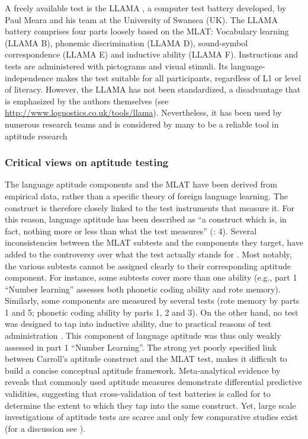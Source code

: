 \documentclass[output=paper]{langscibook}
\begin{document}
A freely available test is the LLAMA \citep{MearaEtAl2001}, a computer test battery developed, by Paul Meara and his team at the University of Swansea (UK). The LLAMA battery comprises four parts loosely based on the MLAT: Vocabulary learning (LLAMA B), phonemic discrimination (LLAMA D), sound-symbol correspondence (LLAMA E) and inductive ability (LLAMA F). Instructions and tests are administered with pictograms and visual stimuli. Its language-independence makes the test suitable for all participants, regardless of L1 or level of literacy. However, the LLAMA has not been standardized, a disadvantage that is emphasized by the authors themselves (see \url{http://www.lognostics.co.uk/tools/llama}{).} Nevertheless, it has been used by numerous research teams and is considered by many to be a reliable tool in aptitude research \citep{RogersEtAl2017}

\subsubsection{Critical views on aptitude testing} %

The language aptitude components and the MLAT have been derived from empirical data, rather than a specific theory of foreign language learning. The construct is therefore closely linked to the test instruments that measure it. For this reason, language aptitude has been described as “a construct which is, in fact, nothing more or less than what the test measures” (\citealt{SafarKormos2008}: 4). Several inconsistencies between the MLAT subtests and the components they target, have added to the controversy over what the test actually stands for \citep{Carpenter2008}. Most notably, the various subtests cannot be assigned clearly to their corresponding aptitude component. For instance, some subtests cover more than one ability (e.g., part 1 “Number learning” assesses both phonetic coding ability and rote memory). Similarly, some components are measured by several tests (rote memory by parts 1 and 5; phonetic coding ability by parts 1, 2 and 3). On the other hand, no test was designed to tap into inductive ability, due to practical reasons of test administration \citep{Carpenter2008}. This component of language aptitude was thus only weakly assessed in part 1 “Number Learning”. The strong yet poorly specified link between Carroll’s aptitude construct and the MLAT test, makes it difficult to build a concise conceptual aptitude framework. Meta-analytical evidence by \citet{Li2016} reveals that commonly used aptitude measures demonstrate differential predictive validities, suggesting that cross-validation of test batteries is called for to determine the extent to which they tap into the same construct. Yet, large scale investigations of aptitude tests are scarce and only few comparative studies exist (for a discussion see \citealt{StansfieldReed2019}).\largerpage
\end{document}
